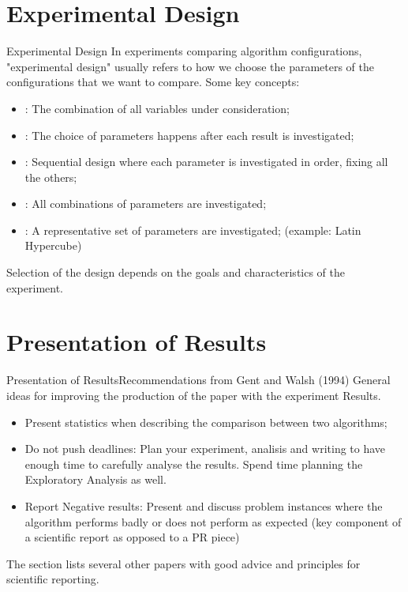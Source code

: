 \documentclass[aspectratio=169]{beamer}
\begin{document}
\section{Experimental Design}

\begin{frame}{Experimental Design}
  In experiments comparing algorithm configurations, "experimental design" usually refers to how we choose the parameters of the configurations that we want to compare. Some key concepts:\bigskip 

  \begin{itemize}
    \item {}: The combination of all variables under consideration;
    \item {}: The choice of parameters happens after each result is investigated;
    \item {}: Sequential design where each parameter is investigated in order, fixing all the others;
    \item {}: All combinations of parameters are investigated;
    \item {}: A representative set of parameters are investigated; (example: Latin Hypercube)
  \end{itemize}
  
  Selection of the design depends on the goals and characteristics of the experiment.
\end{frame}

\section{Presentation of Results}

\begin{frame}{Presentation of Results}{Recommendations from Gent and Walsh (1994)}
  General ideas for improving the production of the paper with the experiment Results.\bigskip 

  \begin{itemize}
    \item Present statistics when describing the comparison between two algorithms; 
    \item Do not push deadlines: Plan your experiment, analisis and writing to have enough time to carefully analyse the results. Spend time planning the Exploratory Analysis as well.
    \item Report Negative results: Present and discuss problem instances where the algorithm performs badly or does not perform as expected (key component of a scientific report as opposed to a PR piece)
  \end{itemize}

  The section lists several other papers with good advice and principles for scientific reporting.
\end{frame}
\end{document}
